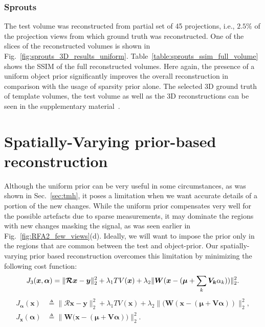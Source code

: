 \documentclass[journal]{IEEEtran}
\def\x{{\mathbf x}}
\begin{document}
\subsubsection{\textbf{Sprouts}}
\label{Sec:sprouts}
The test volume was reconstructed from partial set of 45
projections, i.e., $2.5\%$ of the projection views from which ground
truth was reconstructed.
One of the slices of the reconstructed
 volumes is shown in
 Fig.~\ref{fig:sprouts_3D_results_uniform}. Table~\ref{table:sprouts_ssim_full_volume}
 shows the SSIM of the full reconstructed volumes.  Here again, the
 presence of a uniform object prior significantly improves the overall
 reconstruction in comparison with the usage of sparsity prior alone.
 The selected 3D ground truth of template volumes, the test volume as
 well as the 3D reconstructions can be seen in the supplementary
 material~\cite{supp_paper}.

\section{Spatially-Varying prior-based reconstruction}
\label{sec:method_spatially_varying_prior}

Although the uniform prior can be very useful in some
circumstances, as was shown in Sec.~\ref{sec:tmh}, it poses a 
limitation when we want accurate details of a portion of the new changes. While the
uniform prior compensates very well for the possible artefacts due to
sparse measurements, it may dominate the regions with new changes masking
the signal, as was seen earlier in Fig.~\ref{fig:RFA2_few_views}(d). Ideally, we
will want to impose the prior only in the regions that are common
between the test and object-prior.  Our spatially-varying prior based
reconstruction overcomes this limitation by minimizing the following
cost function:
\begin{equation}
J_3(\boldsymbol{x},\boldsymbol{\alpha}) = \lVert\boldsymbol{\mathcal{R} x}-\boldsymbol{y}\rVert_2^2  + \lambda_1TV(\boldsymbol{x}) +\\ \lambda_2\lVert\boldsymbol{W}(\boldsymbol{x} - (\boldsymbol{\mu} + \sum_{k}\boldsymbol{V_k}\alpha_k))\rVert_2^2.
\label{eq:spatially-varying_prior}
\end{equation}
\begin{align}
J_{\boldsymbol{\alpha}}(\boldsymbol{\x}) &\triangleq \lVert\boldsymbol{\mathcal{R} x- y}\rVert_2^2  + \lambda_1TV(\boldsymbol{x}) +\lambda_2\lVert(\boldsymbol{W}(\boldsymbol{x} - (\boldsymbol{\mu + V\alpha}))\rVert_2^2, \\
J_{\boldsymbol{x}}(\boldsymbol{\alpha}) &\triangleq \lVert\boldsymbol{\boldsymbol{W}(\boldsymbol{x}} - (\boldsymbol{\mu + V\alpha}))\rVert_2^2.
\end{align}
\end{document}
